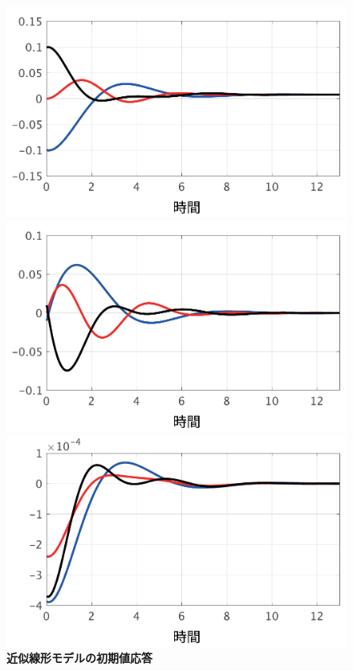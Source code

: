 \documentclass[tombow,dvipdfmx]{corona-a5-1.1}
\begin{document}
\begin{figure}[t]
  \centering
  {
  \begin{minipage}{0.49\linewidth}
    \centering
    \includegraphics[width = 1.0\linewidth]{figs/delta}
    \medskip
  \end{minipage}
  \begin{minipage}{0.49\linewidth}
    \centering
    \includegraphics[width = 1.0\linewidth]{figs/omega}
    \medskip
  \end{minipage}
    \centering
    \includegraphics[width = .49\linewidth]{figs/E}
  }
  \medskip
  \caption{\textbf{近似線形モデルの初期値応答}}
  \label{fig:timeex}
\medskip
\end{figure}
\end{document}
